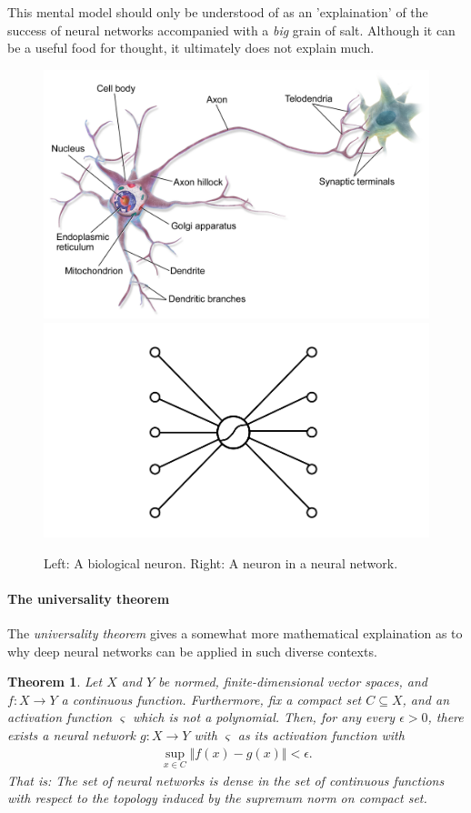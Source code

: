 \documentclass{article}
\newcommand{\sse}{\subseteq}
\newtheorem{theorem}{Theorem}
\newcommand{\norm}[1]{\Vert #1 \Vert}
\begin{document}
This mental model should only be understood of as an 'explaination' of the success of neural networks accompanied with a \emph{big} grain of salt. Although it can be a useful food for thought, it ultimately does not explain much.

\begin{figure}
    \centering
    \includegraphics[width=.4\textwidth]{graphics/Blausen_0657_MultipolarNeuron.png}\hspace{.3cm}\includegraphics[width=.4\textwidth]{graphics/neuron.png}
    \caption{Left: A biological neuron\protect\footnotemark. Right: A neuron in a neural network.}
    \label{fig:neuron}
\end{figure}


\paragraph{The universality theorem} The \emph{universality theorem} gives a somewhat more mathematical explaination as to why deep neural networks can be applied in such diverse contexts.

\begin{theorem} \label{th:universality} Let $X$ and $Y$ be normed, finite-dimensional vector spaces, and $f: X\to Y$ a continuous function. Furthermore, fix a compact set $C\sse X$, and an activation function $\varsigma$ which is not a polynomial. Then, for any every $\epsilon>0$, there exists a neural network $g: X \to Y$ with $\varsigma$ as its activation function with
\begin{align*}
    \sup_{x\in C} \norm{f(x)-g(x)} <\epsilon.
\end{align*}
That is: The set of neural networks is dense in the set of continuous functions with respect to the topology induced by the supremum norm on compact set.
\end{theorem}
\end{document}
